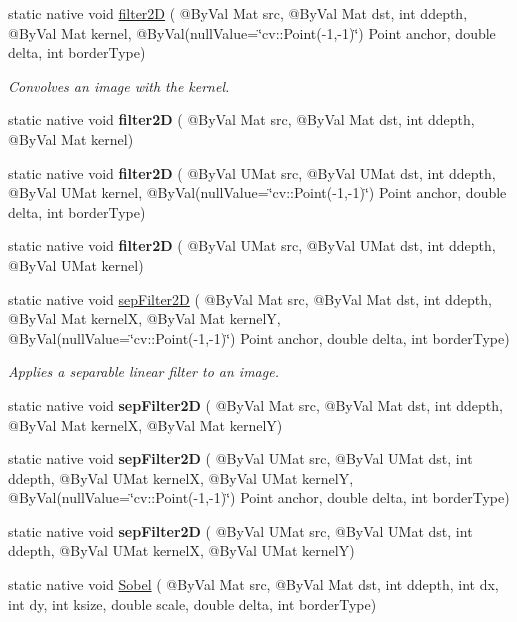 \begin{DoxyCompactItemize}
static native void \hyperlink{group__imgproc__filter_gac272007b4c23c22cf0fd246522a2a34b}{filter2D} ( @By\+Val Mat src, @By\+Val Mat dst, int ddepth, @By\+Val Mat kernel, @By\+Val(null\+Value=\char`\"{}cv\+::\+Point(-\/1,-\/1)\char`\"{}) Point anchor, double delta, int border\+Type)
\begin{DoxyCompactList}\small\item\em Convolves an image with the kernel. \end{DoxyCompactList}\item 
static native void {\bfseries filter2D} ( @By\+Val Mat src, @By\+Val Mat dst, int ddepth, @By\+Val Mat kernel)
\item 
static native void {\bfseries filter2D} ( @By\+Val U\+Mat src, @By\+Val U\+Mat dst, int ddepth, @By\+Val U\+Mat kernel, @By\+Val(null\+Value=\char`\"{}cv\+::\+Point(-\/1,-\/1)\char`\"{}) Point anchor, double delta, int border\+Type)
\item 
static native void {\bfseries filter2D} ( @By\+Val U\+Mat src, @By\+Val U\+Mat dst, int ddepth, @By\+Val U\+Mat kernel)
\item 
static native void \hyperlink{group__imgproc__filter_ga716654f3d25206913e265bf388fd83d0}{sep\+Filter2D} ( @By\+Val Mat src, @By\+Val Mat dst, int ddepth, @By\+Val Mat kernelX, @By\+Val Mat kernelY, @By\+Val(null\+Value=\char`\"{}cv\+::\+Point(-\/1,-\/1)\char`\"{}) Point anchor, double delta, int border\+Type)
\begin{DoxyCompactList}\small\item\em Applies a separable linear filter to an image. \end{DoxyCompactList}\item 
static native void {\bfseries sep\+Filter2D} ( @By\+Val Mat src, @By\+Val Mat dst, int ddepth, @By\+Val Mat kernelX, @By\+Val Mat kernelY)
\item 
static native void {\bfseries sep\+Filter2D} ( @By\+Val U\+Mat src, @By\+Val U\+Mat dst, int ddepth, @By\+Val U\+Mat kernelX, @By\+Val U\+Mat kernelY, @By\+Val(null\+Value=\char`\"{}cv\+::\+Point(-\/1,-\/1)\char`\"{}) Point anchor, double delta, int border\+Type)
\item 
static native void {\bfseries sep\+Filter2D} ( @By\+Val U\+Mat src, @By\+Val U\+Mat dst, int ddepth, @By\+Val U\+Mat kernelX, @By\+Val U\+Mat kernelY)
\item 
static native void \hyperlink{group__imgproc__filter_ga99eaf057a0aad8f1ba5bc04ca0defe15}{Sobel} ( @By\+Val Mat src, @By\+Val Mat dst, int ddepth, int dx, int dy, int ksize, double scale, double delta, int border\+Type)

\end{DoxyCompactItemize}
